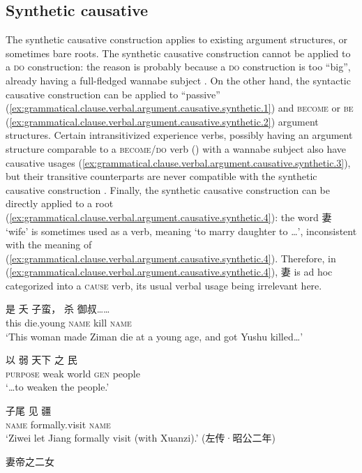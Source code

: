 \documentclass[UTF8, a4paper, oneside, scheme=plain, 12pt]{ctexrep}
\newcommand*{\citepage}[1]{p.~{#1}}
\newcommand{\translate}[1]{`#1'}
\newcommand*{\category}[1]{\textsc{#1}}
\begin{document}
\subsection{Synthetic causative}\label{sec:grammatical.clause.verbal.argument-structure.causative.synthetic}

The synthetic causative construction applies to existing argument structures, or sometimes bare roots.
The synthetic causative construction cannot be applied to a \category{do} construction:
the reason is probably because a \category{do} construction is too ``big'',
already having a full-fledged wannabe subject \citep[\citepage{363-364}]{meiguang2018}.
On the other hand, the syntactic causative construction can be applied to 
``passive'' (\ref{ex:grammatical.clause.verbal.argument.causative.synthetic.1})
and \category{become} or \category{be} (\ref{ex:grammatical.clause.verbal.argument.causative.synthetic.2}) argument structures.
Certain intransitivized experience verbs,
possibly having an argument structure comparable to a \category{become}/\category{do} verb () with a wannabe subject also have causative usages
(\ref{ex:grammatical.clause.verbal.argument.causative.synthetic.3}),
but their transitive counterparts are never compatible with the synthetic causative construction
\citep[\citepage{274}]{meiguang2018}.
Finally, the synthetic causative construction can be directly applied to a root (\ref{ex:grammatical.clause.verbal.argument.causative.synthetic.4}):
the word 妻 \translate{wife} is sometimes used as a verb,
meaning \translate{to marry daughter to \dots},
inconsistent with the meaning of (\ref{ex:grammatical.clause.verbal.argument.causative.synthetic.4}).
Therefore, in (\ref{ex:grammatical.clause.verbal.argument.causative.synthetic.4}),
妻 is ad hoc categorized into a \category{cause} verb,
its usual verbal usage being irrelevant here.

\begin{exe}
    \ex\label{ex:grammatical.clause.verbal.argument.causative.synthetic.1}
    \gll 是 夭 子蛮， 杀 御叔…… \\
    this die.young \category{name} kill \category{name} \\
    \glt\translate{This woman made Ziman die at a young age, and got Yushu killed\dots}
    
    \ex\label{ex:grammatical.clause.verbal.argument.causative.synthetic.2}
    \gll 以 弱 天下 之 民 \\
    \category{purpose} weak world \category{gen} people \\
    \glt\translate{\dots to weaken the people.}

    \ex\label{ex:grammatical.clause.verbal.argument.causative.synthetic.3}
    \gll 子尾 见 疆 \\
    \category{name} formally.visit \category{name} \\
    \glt\translate{Ziwei let Jiang formally visit (with Xuanzi).} (左传·昭公二年)

    \ex\label{ex:grammatical.clause.verbal.argument.causative.synthetic.4} 妻帝之二女
\end{exe}
\end{document}
